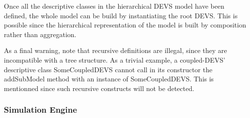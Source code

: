 Once all the descriptive classes in the hierarchical DEVS model have been defined, the whole model can be build by instantiating the 
root DEVS. This is possible since the hierarchical representation of the model is built by composition rather than aggregation.

As a final warning, note that recursive definitions are illegal, since they are incompatible with a tree structure. As a trivial example, 
a coupled-DEVS' descriptive class SomeCoupledDEVS cannot call in its constructor the addSubModel method with an instance of 
SomeCoupledDEVS. This is mentionned since such recursive constructs will not be detected.

\subsubsection{Simulation Engine}
